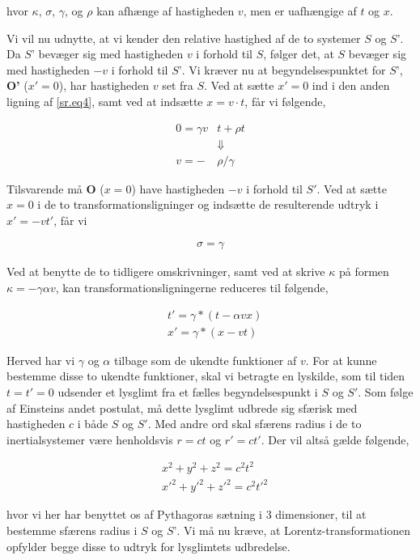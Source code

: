 hvor $\kappa$, $\sigma$, $\gamma$, og $\rho$ kan afhænge af hastigheden $v$, men er uafhængige af $t$ og $x$.

Vi vil nu udnytte, at vi kender den relative hastighed af de to systemer $S$ og $S’$. Da $S’$ bevæger sig med hastigheden $v$ i forhold til $S$, følger det, at $S$ bevæger sig med hastigheden $-v$ i forhold til $S’$. Vi kræver nu at begyndelsespunktet for $S’$, \textbf{O'} ($x'=0$), har hastigheden $v$ set fra $S$. Ved at sætte $x'=0$ ind i den anden ligning af \ref{sr.eq4}, samt ved at indsætte $x=v\cdot t$, får vi følgende,

\begin{align}
	0=\gamma v&t+\rho t \nonumber \\
	&\Downarrow \nonumber \\
	v=-&\rho / \gamma
\end{align}

Tilsvarende må \textbf{O} ($x=0$) have hastigheden $-v$ i forhold til $S'$. Ved at sætte $x=0$ i de to transformationsligninger og indsætte de resulterende udtryk i $x'=-vt'$, får vi

\begin{align}
	\sigma=\gamma
\end{align}

Ved at benytte de to tidligere omskrivninger, samt ved at skrive $\kappa$ på formen $\kappa=-\gamma \alpha v$, kan transformationsligningerne reduceres til følgende,

\begin{align}
	&t'=\gamma*(t-\alpha vx) \\
	&x'=\gamma*(x-vt)
\end{align}

Herved har vi $\gamma$ og $\alpha$ tilbage som de ukendte funktioner af $v$. For at kunne bestemme disse to ukendte funktioner, skal vi betragte en lyskilde, som til tiden $t=t'=0$ udsender et lysglimt fra et fælles begyndelsespunkt i $S$ og $S'$. Som følge af Einsteins andet postulat, må dette lysglimt udbrede sig sfærisk med hastigheden $c$ i både $S$ og $S'$. Med andre ord skal sfærens radius i de to inertialsystemer være henholdsvis $r=ct$ og $r'=ct'$. Der vil altså gælde følgende,

\begin{align}
	&x^2+y^2+z^2=c^2t^2 \\
	&x'^2+y'^2+z'^2=c^2t'^2 \label{sr.eq5}
\end{align}

hvor vi her har benyttet os af Pythagoras sætning i 3 dimensioner, til at bestemme sfærens radius i $S$ og $S’$. Vi må nu kræve, at Lorentz-transformationen opfylder begge disse to udtryk for lysglimtets udbredelse.

